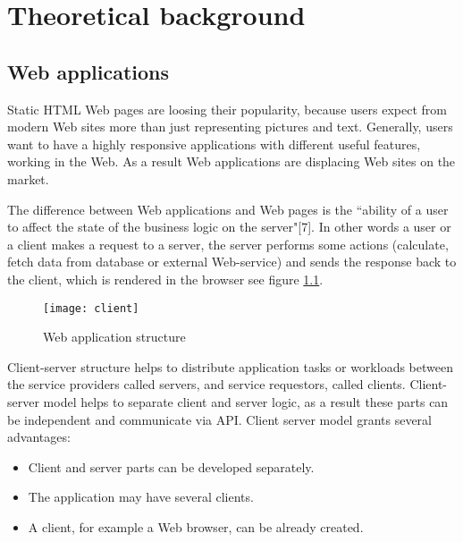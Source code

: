 \chapter{Theoretical background}
\label{ch:background} 
	\section{Web applications}
		
	  Static HTML Web pages are loosing their popularity, because users
	  expect from modern Web sites more than just representing pictures and text.
	  Generally, users want to have a highly responsive applications with
	  different useful features, working in the Web. As a result Web applications are displacing Web
	  sites on the market.
	  
	   The difference between Web applications and Web pages is the
	 ``ability of a user to affect the state of the business logic on the
	 server"[7]. In other words a user or a client makes a request to a server,
	 the server performs some actions (calculate, fetch data from database or
	 external Web-service) and sends the response back to the client, which is rendered in the browser see
	  figure \ref{fig:pic1}.
	  
	  \begin{figure}
      	\texttt{[image: client]}
      	\caption{Web application structure}
      	\label{fig:pic1}
      \end{figure}
	  
    	Client-server structure helps to distribute application tasks or workloads
    	between the service providers called servers, and service requestors,
    	called clients. Client-server model helps to separate client and server logic, as
    	a result these parts can be independent and communicate via API. Client
    	server model grants several advantages:
    	\begin{itemize}
    	  \item Client and server parts can be developed separately.
    	  \item The application may have several clients.
    	  \item A client, for example a Web browser, can be already created.
    	\end{itemize}
    		

